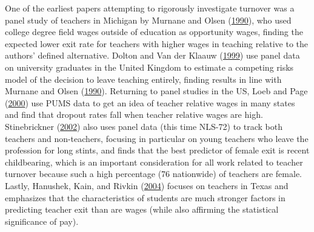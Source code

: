 \documentclass[]{article}
\begin{document}
One of the earliest papers attempting to rigorously investigate turnover
was a panel study of teachers in Michigan by Murnane and Olsen
(\protect\hyperlink{ref-murnane}{1990}), who used college degree field
wages outside of education as opportunity wages, finding the expected
lower exit rate for teachers with higher wages in teaching relative to
the authors' defined alternative. Dolton and Van der Klaauw
(\protect\hyperlink{ref-dolton}{1999}) use panel data on university
graduates in the United Kingdom to estimate a competing risks model of
the decision to leave teaching entirely, finding results in line with
Murnane and Olsen (\protect\hyperlink{ref-murnane}{1990}). Returning to
panel studies in the US, Loeb and Page
(\protect\hyperlink{ref-loeb}{2000}) use PUMS data to get an idea of
teacher relative wages in many states and find that dropout rates fall
when teacher relative wages are high. Stinebrickner
(\protect\hyperlink{ref-stinebrickner}{2002}) also uses panel data (this
time NLS-72) to track both teachers and non-teachers, focusing in
particular on young teachers who leave the profession for long stints,
and finds that the best predictor of female exit is recent childbearing,
which is an important consideration for all work related to teacher
turnover because such a high percentage (76 nationwide) of teachers are
female. Lastly, Hanushek, Kain, and Rivkin
(\protect\hyperlink{ref-hanushek}{2004}) focuses on teachers in Texas
and emphasizes that the characteristics of students are much stronger
factors in predicting teacher exit than are wages (while also affirming
the statistical significance of pay).
\end{document}
